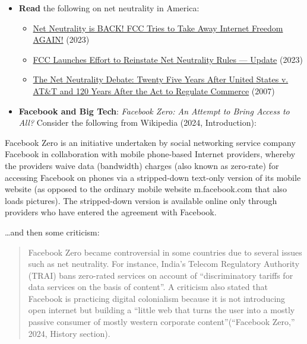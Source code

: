 \documentclass[
  letterpaper,
  DIV=11,
  numbers=noendperiod]{scrreprt}
\providecommand{\tightlist}{%
  \setlength{\itemsep}{0pt}\setlength{\parskip}{0pt}}\usepackage{longtable,booktabs,array}
\begin{document}
\begin{tcolorbox}
\begin{itemize}
\tightlist
\item
  \textbf{Read} the following on net neutrality in America:

  \begin{itemize}
  \tightlist
  \item
    \href{https://www.youtube.com/watch?v=DCfWzAM-JeY}{Net Neutrality is
    BACK! FCC Tries to Take Away Internet Freedom AGAIN!} (2023)
  \item
    \href{https://deadline.com/2023/10/net-neutrality-fcc-reinstate-jessica-rosenworcel-1235556493/}{FCC
    Launches Effort to Reinstate Net Neutrality Rules --- Update} (2023)
  \item
    \href{https://siepr.stanford.edu/publications/working-paper/net-neutrality-debate-twenty-five-years-after-united-states-v-att-and}{The
    Net Neutrality Debate: Twenty Five Years After United States v.
    AT\&T and 120 Years After the Act to Regulate Commerce} (2007)
  \end{itemize}
\item
  \textbf{Facebook and Big Tech}: \emph{Facebook Zero: An Attempt to
  Bring Access to All?} Consider the following from Wikipedia (2024,
  Introduction):
\end{itemize}

Facebook Zero is an initiative undertaken by social networking service
company Facebook in collaboration with mobile phone-based Internet
providers, whereby the providers waive data (bandwidth) charges (also
known as zero-rate) for accessing Facebook on phones via a stripped-down
text-only version of its mobile website (as opposed to the ordinary
mobile website m.facebook.com that also loads pictures). The
stripped-down version is available online only through providers who
have entered the agreement with Facebook.

\ldots and then some criticism:

\begin{quote}
Facebook Zero became controversial in some countries due to several
issues such as net neutrality. For instance, India's Telecom Regulatory
Authority (TRAI) bans zero-rated services on account of ``discriminatory
tariffs for data services on the basis of content''. A criticism also
stated that Facebook is practicing digital colonialism because it is not
introducing open internet but building a ``little web that turns the
user into a mostly passive consumer of mostly western corporate
content''(``Facebook Zero,'' 2024, History section).
\end{quote}


\end{tcolorbox}
\end{document}
